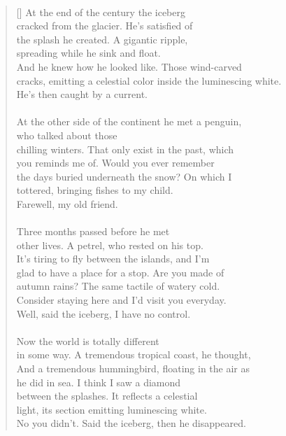 \documentclass{book}
\begin{document}
\newpage
\poemtitle{\textcolor[RGB]{165,15,15}{The penguin, the petrel, \\the hummingbird and the iceberg}}
\hspace*{\fill} \\
\settowidth{\versewidth}{cracks, emitting a celestial color inside the luminescing white.}
\begin{verse}[\versewidth]
    At the end of the century the iceberg\\
    cracked from the glacier. He's satisfied of\\
    the splash he created. A gigantic ripple, \\
    spreading while he sink and float. \\
    And he knew how he looked like. Those wind-carved\\
    cracks, emitting a celestial color inside the luminescing white.\\
    He's then caught by a current. \\
    \hspace*{\fill} \\
    At the other side of the continent he met a penguin, \\
    who talked about those\\
    chilling winters. That only exist in the past, which\\
    you reminds me of. Would you ever remember \\
    the days buried underneath the snow? On which I\\
    tottered, bringing fishes to my child.\\
    Farewell, my old friend.\\
    \hspace*{\fill} \\
    Three months passed before he met\\
    other lives. A petrel, who rested on his top.\\
    It's tiring to fly between the islands, and I'm\\
    glad to have a place for a stop. Are you made of\\
    autumn rains? The same tactile of watery cold.\\
    Consider staying here and I'd visit you everyday.\\
    Well, said the iceberg, I have no control.\\
    \hspace*{\fill} \\
    Now the world is totally different\\
    in some way. A tremendous tropical coast, he thought,\\
    And a tremendous hummingbird, floating in the air as \\
    he did in sea. I think I saw a diamond \\
    between the splashes. It reflects a celestial\\
    light, its section emitting luminescing white. \\
    No you didn't. Said the iceberg, then he disappeared.\\
\end{verse}
\end{document}
